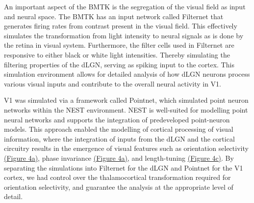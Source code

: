 \documentclass[12pt]{article}
\begin{document}
An important aspect of the BMTK is the segregation of the visual field as input and neural space. The BMTK has an input network called Filternet that generates firing rates from contrast present in the visual field. This effectively simulates the transformation from light intensity to neural signals as is done by the retina in visual system. Furthermore, the filter cells used in Filternet are responsive to either black or white light intensities. Thereby simulating the filtering properties of the dLGN, serving as spiking input to the cortex. This simulation environment allows for detailed analysis of how dLGN neurons process various visual inputs and contribute to the overall neural activity in V1.

V1 was simulated via a framework called Pointnet, which simulated point neuron networks within the NEST environment. NEST is well-suited for modelling point neural networks and supports the integration of predeveloped point-neuron models. This approach enabled the modelling of cortical processing of visual information, where the integration of inputs from the dLGN and the cortical circuitry results in the emergence of visual features such as orientation selectivity \hyperref[fig:LIF_Overview]{(Figure 4a)}, phase invariance \hyperref[fig:LIF_Overview]{(Figure 4a)}, and length-tuning \hyperref[fig:LIF_Overview]{(Figure 4c)}. By separating the simulations into Filternet for the dLGN and Pointnet for the V1 cortex, we had control over the thalamocortical transformation required for orientation selectivity, and guarantee the analysis at the appropriate level of detail.
\bigbreak
\end{document}
